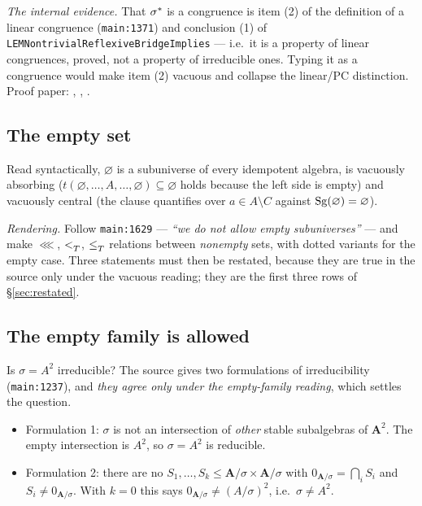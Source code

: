 \emph{The internal evidence.} That $\sigma^{*}$ is a congruence is item (2)
of the definition of a linear congruence (\texttt{main:1371}) and conclusion
(1) of \texttt{LEMNontrivialReflexiveBridgeImplies} --- i.e.\ it is a property
of linear congruences, proved, not a property of irreducible ones. Typing it as
a congruence would make item (2) vacuous and collapse the linear/PC
distinction. Proof paper: , ,
.

\subsection{The empty set}\label{sec:leg-empty}

Read syntactically, $\varnothing$ is a subuniverse of every idempotent algebra,
is vacuously absorbing ($t(\varnothing,\dots,A,\dots,\varnothing)\subseteq
\varnothing$ holds because the left side is empty) and vacuously central (the
clause quantifies over $a\in A\setminus C$ against $\operatorname{Sg}(\varnothing)=
\varnothing$).

\emph{Rendering.} Follow \texttt{main:1629} --- \emph{``we do not allow empty
subuniverses''} --- and make $\lll$, $<_{T}^{}$, $\le_{T}^{}$ relations between
\emph{nonempty} sets, with dotted variants for the empty case. Three statements
must then be restated, because they are true in the source only under the
vacuous reading; they are the first three rows of \S\ref{sec:restated}.

\subsection{The empty family is allowed}\label{sec:leg-emptyfamily}

Is $\sigma=A^{2}$ irreducible? The source gives two formulations of
irreducibility (\texttt{main:1237}), and \emph{they agree only under the
empty-family reading}, which settles the question.

\begin{itemize}\tightlist
\item Formulation 1: $\sigma$ is not an intersection of \emph{other} stable
  subalgebras of $\mathbf A^{2}$. The empty intersection is $A^{2}$, so
  $\sigma=A^{2}$ is reducible.
\item Formulation 2: there are no $S_{1},\dots,S_{k}\le\mathbf A/\sigma\times
  \mathbf A/\sigma$ with $0_{\mathbf A/\sigma}=\bigcap_{i}S_{i}$ and
  $S_{i}\neq0_{\mathbf A/\sigma}$. With $k=0$ this says
  $0_{\mathbf A/\sigma}\neq(A/\sigma)^{2}$, i.e.\ $\sigma\neq A^{2}$.
\end{itemize}


